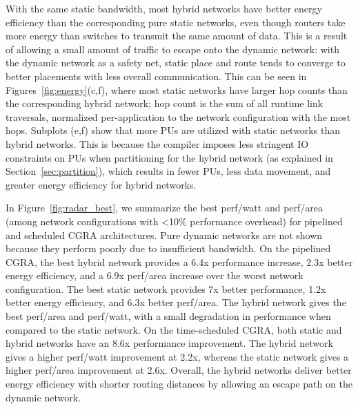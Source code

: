 With the same static bandwidth, most hybrid networks have better energy efficiency than the corresponding pure static networks, even though routers take more energy than switches to transmit the same amount of data.
This is a result of allowing a small amount of traffic to escape onto the dynamic network: with the dynamic network as a safety net, static place and route tends to converge to better placements with less overall communication.
This can be seen in Figures~\ref{fig:energy}(c,f), where most static networks have larger hop counts than the corresponding hybrid network; hop count is the sum of all runtime link traversals, normalized per-application to the network configuration with the most hops.
Subplots (e,f) show that more PUs are utilized with static networks than hybrid networks.
This is because the compiler imposes less stringent IO constraints on PUs when partitioning for the hybrid network (as explained in Section~\ref{sec:partition}), which results in fewer PUs, less data movement, and greater energy efficiency for hybrid networks.

In Figure~\ref{fig:radar_best}, we summarize the best perf/watt and perf/area (among network configurations with <10\% performance overhead) for pipelined and scheduled CGRA architectures. 
Pure dynamic networks are not shown because they perform poorly due to insufficient bandwidth.
On the pipelined CGRA, the best hybrid network provides a 6.4x performance increase, 2.3x better energy efficiency, and a 6.9x perf/area increase over the worst network configuration. 
The best static network provides 7x better performance, 1.2x better energy efficiency, and 6.3x better perf/area. 
The hybrid network gives the best perf/area and perf/watt, with a small degradation in performance when compared to the static network. 
On the time-scheduled CGRA, both static and hybrid networks have an 8.6x performance improvement. 
The hybrid network gives a higher perf/watt improvement at 2.2x, whereas the static network gives a higher perf/area improvement at 2.6x.
Overall, the hybrid networks deliver better energy efficiency with shorter routing distances by allowing an escape path on the dynamic network.



